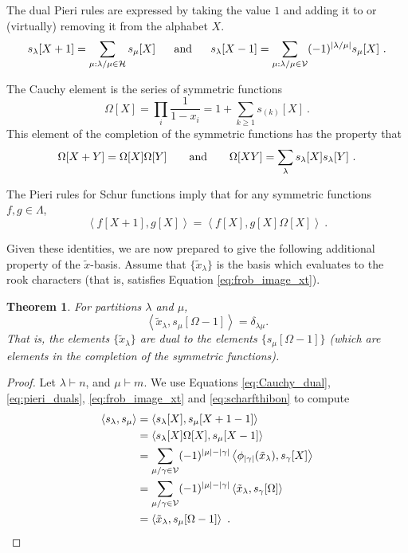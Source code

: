 \documentclass{amsart}
\newtheorem{theorem}[lemma]{Theorem}
\theoremstyle{definition}
\newcommand{\xt}{\tilde x}
\begin{document}
The dual Pieri rules are expressed by taking the value $1$ and
adding it to or (virtually) removing it from the alphabet $X$.
\begin{equation}\label{eq:pieri_duals}
s_\lambda[X + 1] = \sum_{\mu : \lambda / \mu \in \mathcal{H}} s_\mu[X]
~~~~~\hbox{and}~~~~~
s_\lambda[X - 1] = \sum_{\mu : \lambda / \mu \in \mathcal{V}} (-1)^{|\lambda/\mu|} s_\mu[X]~.
\end{equation}

The Cauchy element is the series of symmetric functions
\begin{equation}\label{eq:cauchy}
\Omega[X] = \prod_{i} \frac{1}{1-x_i} = 1 + \sum_{k\geq1} s_{(k)}[X]~.
\end{equation}
This element of the completion of the symmetric functions has the property that
\begin{equation}\label{eq:Cauchy_properties}
\Omega[X+Y] = \Omega[X]\Omega[Y]\qquad\hbox{and}\qquad\Omega[XY] = \sum_{\lambda} s_\lambda[X] s_\lambda[Y]~.
\end{equation}

The Pieri rules for Schur functions imply that
for any symmetric functions $f, g \in \Lambda$,
\begin{equation}\label{eq:Cauchy_dual}
\left< f[X+1], g[X] \right> = \left< f[X], g[X] \Omega[X] \right>~.
\end{equation}

Given these identities, we are now prepared to give the
following additional property of the $\xt$-basis.
Assume that $\{ \xt_\lambda  \}$ is the basis which
evaluates to the rook characters
(that is, satisfies Equation \eqref{eq:frob_image_xt}).

\begin{theorem} \label{thm:dual_basis}
For partitions $\lambda$ and $\mu$,
\[
\left< \xt_\lambda, s_\mu[\Omega-1] \right> = \delta_{\lambda\mu}.
\]
That is, the elements $\{ \xt_\lambda \}$ are dual to the elements
$\{ s_\mu[\Omega-1] \}$ (which are elements in the completion of the symmetric functions).
\end{theorem}

\begin{proof}
Let $\lambda \vdash n$, and $\mu \vdash m$.  We use Equations \eqref{eq:Cauchy_dual}, \eqref{eq:pieri_duals},
\eqref{eq:frob_image_xt} and \eqref{eq:scharfthibon} to compute
\begin{align*}
\left< s_\lambda, s_\mu \right> &= \left< s_\lambda[X], s_\mu[X+1-1] \right>\\
&= \left< s_\lambda[X] \Omega[X], s_\mu[X-1] \right>\\
&= \sum_{\mu/\gamma \in \mathcal{V}} (-1)^{|\mu|-|\gamma|}
\left< \phi_{|\gamma|}( \xt_\lambda ), s_{\gamma}[X] \right>\\
&= \sum_{\mu/\gamma \in \mathcal{V}} (-1)^{|\mu|-|\gamma|}
\left< \xt_\lambda, s_\gamma[\Omega] \right>\\
&= \left< \xt_\lambda, s_\mu[ \Omega - 1] \right>~.\qedhere
\end{align*}
\end{proof}
\end{document}
